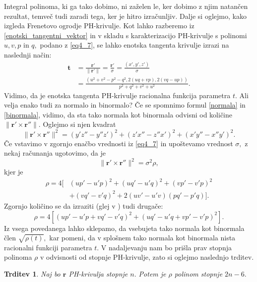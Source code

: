 \documentclass[12pt,a4paper,twoside]{article}
\theoremstyle{definition} %
\theoremstyle{plain} %
\newtheorem{trditev}[definicija]{Trditev}
\theoremstyle{primerstyle}
\numberwithin{equation}{section}  %
\newcommand{\tV}{\mathbf{t}}
\newcommand{\rV}{\mathbf{r}}
\begin{document}
Integral polinoma, ki ga tako dobimo, ni zaželen le, ker dobimo z njim natančen rezultat, temveč tudi zaradi tega, ker je hitro izračunljiv. Dalje si oglejmo, kako izgleda Frenetovo ogrodje PH-krivulje. Kot lahko razberemo iz \eqref{enotski_tangentni_vektor} in v skladu s karakterizacijo PH-krivulje s polinomi $u,v,p$ in $q,$ podano z \eqref{eq4_7}, se lahko enotska tangenta krivulje izrazi na naslednji način:
\begin{align}
	\tV&=\frac{\rV'}{\lVert \rV' \rVert}=\frac{\rV'}{\sigma}=\frac{(x',y',z')}{\sigma} \nonumber \\
	&=\frac{(u^2+v^2-p^2-q^2,2(uq+vp),2(vq-up))}{p^2+q^2+v^2+u^2}.
\end{align}
Vidimo, da je enotska tangenta PH-krivulje racionalna funkcija parametra $t.$ Ali velja enako tudi za normalo in binormalo? Če se spomnimo formul \eqref{normala} in \eqref{binormala}, vidimo, da sta tako normala kot binormala odvisni od količine $\lVert \rV' \times \rV'' \rVert.$ Oglejmo si njen kvadrat
\begin{equation}
	\label{eq4_12}
	\lVert \rV' \times \rV'' \rVert^2=(y'z''-y''z')^2+(z'x''-z''x')^2+(x'y''-x''y')^2.
\end{equation}
Če vstavimo v zgornjo enačbo vrednosti iz \eqref{eq4_7} in upoštevamo vrednost $\sigma,$ z nekaj računanja \cite[str.\ 386]{farouki2002exact} ugotovimo, da je
\begin{equation}
	\label{eq4_13}
	\lVert \rV' \times \rV'' \rVert^2=\sigma^2\rho,
\end{equation}
kjer je
\begin{align}
	\rho=4[&(up'-u'p)^2+(uq'-u'q)^2+(vp'-v'p)^2 \nonumber \\
	&+(vq'-v'q)^2+2(uv'-u'v)(pq'-p'q)]. \label{rho1}
\end{align}
Zgornjo količino se da izraziti (glej v \cite[str.\ 118]{beltranmonterde}) tudi drugače:
\begin{equation}
	\label{rho2}
	\rho=4[(up'-u'p+vq'-v'q)^2+(uq'-u'q+vp'-v'p)^2].
\end{equation}
Iz vsega povedanega lahko sklepamo, da vsebujeta tako normala kot binormala člen $\sqrt{\rho(t)},$ kar pomeni, da v splošnem tako normala kot binormala nista racionalni funkciji parametra $t.$ V nadaljevanju nam bo prišla prav stopnja polinoma $\rho$ v odvisnosti od stopnje PH-krivulje, zato si oglejmo naslednjo trditev.
\begin{trditev}
	\label{stopnja_rho_trditev}
	Naj bo $\rV$ PH-krivulja stopnje $n.$ Potem je $\rho$ polinom stopnje $2n-6.$
\end{trditev}
\end{document}
